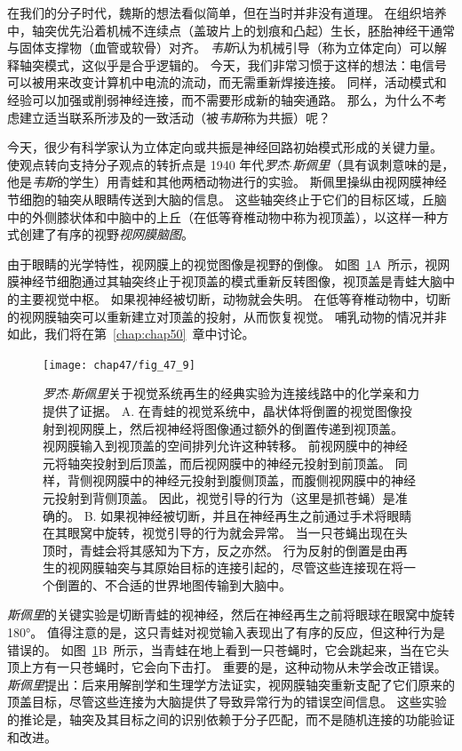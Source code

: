 在我们的分子时代，魏斯的想法看似简单，但在当时并非没有道理。
在组织培养中，轴突优先沿着机械不连续点（盖玻片上的划痕和凸起）生长，胚胎神经干通常与固体支撑物（血管或软骨）对齐。
\textit{韦斯}认为机械引导（称为立体定向）可以解释轴突模式，这似乎是合乎逻辑的。
今天，我们非常习惯于这样的想法：电信号可以被用来改变计算机中电流的流动，而无需重新焊接连接。
同样，活动模式和经验可以加强或削弱神经连接，而不需要形成新的轴突通路。
那么，为什么不考虑建立适当联系所涉及的一致活动（被\textit{韦斯}称为共振）呢？


今天，很少有科学家认为立体定向或共振是神经回路初始模式形成的关键力量。
使观点转向支持分子观点的转折点是 1940 年代\textit{罗杰$\cdot$斯佩里}（具有讽刺意味的是，他是\textit{韦斯}的学生）用青蛙和其他两栖动物进行的实验。
斯佩里操纵由视网膜神经节细胞的轴突从眼睛传送到大脑的信息。
这些轴突终止于它们的目标区域，丘脑中的外侧膝状体和中脑中的上丘（在低等脊椎动物中称为视顶盖），以这样一种方式创建了有序的视野\textit{视网膜脑图}。


由于眼睛的光学特性，视网膜上的视觉图像是视野的倒像。
如图~\ref{fig:47_9}A~所示，视网膜神经节细胞通过其轴突终止于视顶盖的模式重新反转图像，视顶盖是青蛙大脑中的主要视觉中枢。
如果视神经被切断，动物就会失明。
在低等脊椎动物中，切断的视网膜轴突可以重新建立对顶盖的投射，从而恢复视觉。
哺乳动物的情况并非如此，我们将在第~\ref{chap:chap50}~章中讨论。


\begin{figure}[htbp]
	\centering
	\texttt{[image: chap47/fig\_47\_9]}
	\caption{\textit{罗杰$\cdot$斯佩里}关于视觉系统再生的经典实验为连接线路中的化学亲和力提供了证据。
		A. 在青蛙的视觉系统中，晶状体将倒置的视觉图像投射到视网膜上，然后视神经将图像通过额外的倒置传递到视顶盖。
		视网膜输入到视顶盖的空间排列允许这种转移。
		前视网膜中的神经元将轴突投射到后顶盖，而后视网膜中的神经元投射到前顶盖。
		同样，背侧视网膜中的神经元投射到腹侧顶盖，而腹侧视网膜中的神经元投射到背侧顶盖。
		因此，视觉引导的行为（这里是抓苍蝇）是准确的。
		B. 如果视神经被切断，并且在神经再生之前通过手术将眼睛在其眼窝中旋转，视觉引导的行为就会异常。
		当一只苍蝇出现在头顶时，青蛙会将其感知为下方，反之亦然。
		行为反射的倒置是由再生的视网膜轴突与其原始目标的连接引起的，尽管这些连接现在将一个倒置的、不合适的世界地图传输到大脑中。}
	\label{fig:47_9}
\end{figure}


\textit{斯佩里}的关键实验是切断青蛙的视神经，然后在神经再生之前将眼球在眼窝中旋转 180°。
值得注意的是，这只青蛙对视觉输入表现出了有序的反应，但这种行为是错误的。
如图~\ref{fig:47_9}B~所示，当青蛙在地上看到一只苍蝇时，它会跳起来，当在它头顶上方有一只苍蝇时，它会向下击打。
重要的是，这种动物从未学会改正错误。
\textit{斯佩里}提出：后来用解剖学和生理学方法证实，视网膜轴突重新支配了它们原来的顶盖目标，尽管这些连接为大脑提供了导致异常行为的错误空间信息。
这些实验的推论是，轴突及其目标之间的识别依赖于分子匹配，而不是随机连接的功能验证和改进。


